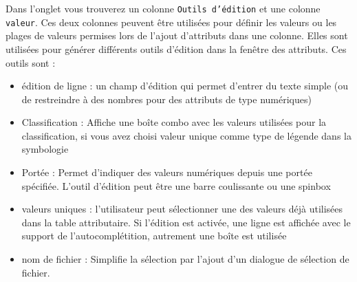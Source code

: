 Dans l'onglet  vous trouverez un colonne \texttt{Outils d'édition} et une colonne \texttt{valeur}. Ces deux colonnes peuvent être utilisées pour définir les valeurs ou les plages de valeurs permises lors de l'ajout d'attributs dans une colonne. Elles sont utilisées pour générer différents outils d'édition dans la fenêtre des attributs. Ces outils sont :
\begin{itemize}[label=--]
\item édition de ligne : un champ d'édition qui permet d'entrer du texte simple (ou de restreindre à des nombres pour des attributs de type numériques)
\item Classification : Affiche une boîte combo avec les valeurs utilisées pour la classification, si vous avez choisi valeur unique comme type de légende dans la symbologie
\item Portée : Permet d'indiquer des valeurs numériques depuis une portée spécifiée. L'outil d'édition peut être une barre coulissante ou une spinbox
\item valeurs uniques : l'utilisateur peut sélectionner une des valeurs déjà utilisées dans la table attributaire. Si l'édition est activée, une ligne est affichée avec le support de l'autocomplétition, autrement une boîte est utilisée
\item nom de fichier : Simplifie la sélection par l'ajout d'un dialogue de sélection de fichier.

\end{itemize}
